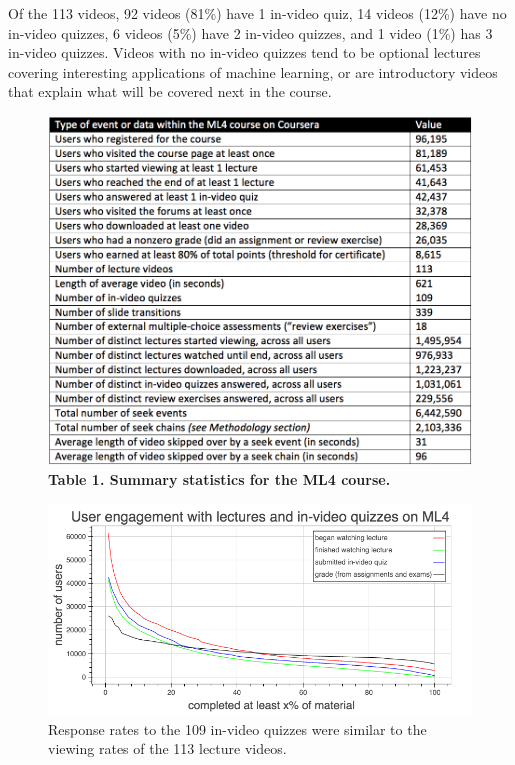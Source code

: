 \documentclass{sigchi}
\begin{document}
Of the 113 videos, 92 videos (81\%) have 1 in-video quiz, 14 videos (12\%) have no in-video quizzes, 6 videos (5\%) have 2 in-video quizzes, and 1 video (1\%) has 3 in-video quizzes. Videos with no in-video quizzes tend to be optional lectures covering interesting applications of machine learning, or are introductory videos that explain what will be covered next in the course. %

\begin{figure}
\includegraphics[width=1.0\columnwidth]{summary-statistics}
\small{\textbf{Table 1. Summary statistics for the ML4 course.}}
\label{fig:summary-statistics}
\end{figure}

\begin{figure}
\includegraphics[width=1.0\columnwidth]{user-engagement-with-material}
\caption{Response rates to the 109 in-video quizzes were similar to the viewing rates of the 113 lecture videos.}
\label{fig:user-engagement-with-material}
\end{figure}
\end{document}
